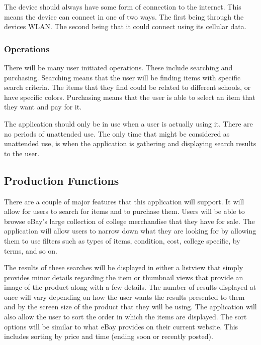 \documentclass[journal,compsoc, 10pt, draftclsnofoot, onecolumn]{IEEEtran}
\begin{document}
The device should always have some form of connection to the internet. This 
means the device can connect in one of two ways. The first being through the 
devices WLAN. The second being that it could connect using its cellular data.

\subsubsection{Operations}

There will be many user initiated operations. These include searching and 
purchasing. Searching means that the user will be finding items with specific 
search criteria. The items that they find could be related to different schools,
 or have specific colors. Purchasing means that the user is able to select an 
item that they want and pay for it.\newline

The application should only be in use when a user is actually using it. There 
are no periods of unattended use. The only time that might be considered as 
unattended use, is when the application is gathering and displaying search 
results to the user. 

\subsection{Production Functions}

There are a couple of major features that this application will support. It will
 allow for users to search for items and to purchase them. Users will be able 
to browse eBay's large collection of college merchandise that they have for 
sale. The application will allow users to narrow down what they are looking for 
by allowing them to use filters such as types of items, condition, cost, college
 specific, by terms, and so on. \newline

The results of these searches will be displayed in either a listview that simply
 provides minor details regarding the item or thumbnail views that provide an 
image of the product along with a few details. The number of results displayed 
at once will vary depending on how the user wants the results presented to them 
and by the screen size of the product that they will be using. The application 
will also allow the user to sort the order in which the items are displayed. The
 sort options will be similar to what eBay provides on their current website. 
This includes sorting by price and time (ending soon or recently posted).
\end{document}
